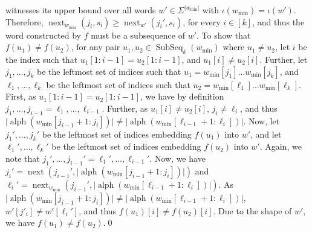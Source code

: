 \documentclass[10pt,a4paper]{amsart}
\makeatletter
\DeclareMathOperator{\alphabet}{alph}
\DeclareMathOperator\ScatFact{SubSeq}
\DeclareMathOperator{\nextAlphPos}{next}
\theoremstyle{plain}
\theoremstyle{definition}
\renewenvironment{proof}[1][\proofname]{\par
  \pushQED{}%
  \normalfont \topsep6\p@\@plus6\p@\relax
  \trivlist
  \item[\hskip\labelsep\itshape #1\@addpunct{.}]\ignorespaces
}{%
  \popQED\endtrivlist\@endpefalse
}
\makeatother
\begin{document}
\begin{proof}
	witnesses its upper bound over all words $w'\in\Sigma^{\vert w_{\min} \vert}$ with $\iota(w_{\min}) = \iota(w')$. Therefore, $\nextAlphPos_{w_{\min}}(j_i,s_i) \geq \nextAlphPos_{w'}(j_i',s_i)$, for every $i \in [k]$, and thus the word constructed by $f$ must be a subsequence of $w'$. To show that $f(u_1) \neq f(u_2)$, for any pair $u_1, u_2 \in \ScatFact_k(w_{\min})$ where $u_1 \neq u_2$, let $i$ be the index such that $u_1[1: i - 1] = u_2[1 : i - 1]$, and $u_1[i] \neq u_2[i]$. Further, let $j_1, \dots, j_k$ be the leftmost set of indices such that $u_1 = w_{\min}[j_1] \dots w_{\min}[j_k]$, and $\ell_1, \dots, \ell_k$ be the leftmost set of indices such that $u_2 = w_{\min}[\ell_1] \dots w_{\min}[\ell_k]$. First, as $u_1[1:i - 1] = u_2[1:i - 1]$, we have by definition $j_1, \dots, j_{i - 1} = \ell_1, \dots, \ell_{i - 1}$. Further, as $u_1[i] \neq u_2[i]$, $j_i \neq \ell_i$, and thus $\vert \alphabet(w_{\min}[j_{i - 1} + 1 : j_{i}]) \vert \neq \vert \alphabet(w_{\min}[\ell_{i - 1} + 1 : \ell_i]) \vert$. Now, let $j_1', \dots, j_k'$ be the leftmost set of indices embedding $f(u_1)$ into $w'$, and let $\ell_1', \dots, \ell_k'$ be the leftmost set of indices embedding $f(u_2)$ into $w'$. Again, we note that $j_1', \dots, j_{i - 1}' = \ell_1', \dots, \ell_{i - 1}'$. Now, we have $j_i' = \nextAlphPos(j_{i - 1}', \vert \alphabet(w_{\min}[j_{i - 1} + 1 : j_{i}]) \vert)$ and $\ell_i' =  \nextAlphPos_{w_{\min}}(j_{i - 1}', \vert \alphabet(w_{\min}[\ell_{i - 1} + 1 : \ell_i]) \vert)$. As $\vert \alphabet(w_{\min}[j_{i - 1} + 1 : j_{i}]) \vert \neq \vert \alphabet(w_{\min}[\ell_{i - 1} + 1 : \ell_i]) \vert$, $w'[j'_i] \neq w'[\ell_i']$, and thus $f(u_1)[i] \neq f(u_2)[i]$. Due to the shape of $w'$, we have $f(u_1) \neq f(u_2)$.\qed

\end{proof}
\end{document}
